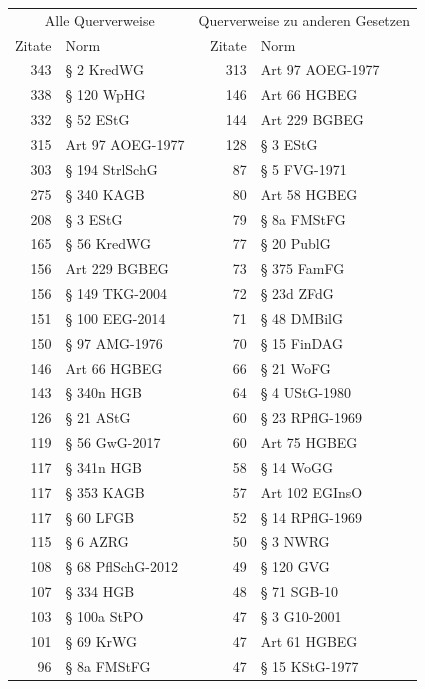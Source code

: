 \begin{tabular}{rl|rl}
\multicolumn{2}{c}{Alle Querverweise} & \multicolumn{2}{|c}{Querverweise zu anderen Gesetzen} \\
Zitate & Norm & Zitate & Norm \\
\midrule
343 & § 2 KredWG & 313 & Art 97 AOEG-1977 \\
338 & § 120 WpHG & 146 & Art 66 HGBEG \\
332 & § 52 EStG & 144 & Art 229 BGBEG \\
315 & Art 97 AOEG-1977 & 128 & § 3 EStG \\
303 & § 194 StrlSchG & 87 & § 5 FVG-1971 \\
275 & § 340 KAGB & 80 & Art 58 HGBEG \\
208 & § 3 EStG & 79 & § 8a FMStFG \\
165 & § 56 KredWG & 77 & § 20 PublG \\
156 & Art 229 BGBEG & 73 & § 375 FamFG \\
156 & § 149 TKG-2004 & 72 & § 23d ZFdG \\
151 & § 100 EEG-2014 & 71 & § 48 DMBilG \\
150 & § 97 AMG-1976 & 70 & § 15 FinDAG \\
146 & Art 66 HGBEG & 66 & § 21 WoFG \\
143 & § 340n HGB & 64 & § 4 UStG-1980 \\
126 & § 21 AStG & 60 & § 23 RPflG-1969 \\
119 & § 56 GwG-2017 & 60 & Art 75 HGBEG \\
117 & § 341n HGB & 58 & § 14 WoGG \\
117 & § 353 KAGB & 57 & Art 102 EGInsO \\
117 & § 60 LFGB & 52 & § 14 RPflG-1969 \\
115 & § 6 AZRG & 50 & § 3 NWRG \\
108 & § 68 PflSchG-2012 & 49 & § 120 GVG \\
107 & § 334 HGB & 48 & § 71 SGB-10 \\
103 & § 100a StPO & 47 & § 3 G10-2001 \\
101 & § 69 KrWG & 47 & Art 61 HGBEG \\
96 & § 8a FMStFG & 47 & § 15 KStG-1977 \\
\end{tabular}
